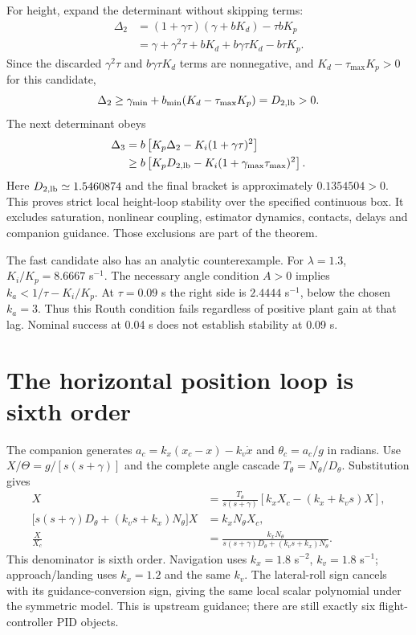 For height, expand the determinant without skipping terms:
\begin{align}
\Delta_2&=(1+\gamma\tau)(\gamma+bK_d)-\tau bK_p\\
&=\gamma+\gamma^2\tau+bK_d+b\gamma\tau K_d-b\tau K_p.
\end{align}
Since the discarded $\gamma^2\tau$ and $b\gamma\tau K_d$ terms are nonnegative,
and $K_d-\tau_{\max}K_p>0$ for this candidate,
\begin{equation}
\Delta_2\geq\gamma_{\min}+b_{\min}(K_d-\tau_{\max}K_p)
 =D_{2,\rm lb}>0.
\end{equation}
The next determinant obeys
\begin{align}
\Delta_3&=b\left[K_p\Delta_2-K_i(1+\gamma\tau)^2\right]\\
&\geq b\left[K_pD_{2,\rm lb}-K_i(1+\gamma_{\max}\tau_{\max})^2\right].
\end{align}
Here $D_{2,\rm lb}\simeq1.5460874$ and the final bracket is approximately
$0.1354504>0$. This proves strict local height-loop stability over the specified
continuous box. It excludes saturation, nonlinear coupling, estimator dynamics,
contacts, delays and companion guidance. Those exclusions are part of the theorem.

The fast candidate also has an analytic counterexample. For $\lambda=1.3$,
$K_i/K_p=8.6667$ s$^{-1}$. The necessary angle condition $A>0$ implies
$k_a<1/\tau-K_i/K_p$. At $\tau=0.09$ s the right side is
$2.4444$ s$^{-1}$, below the chosen $k_a=3$. Thus this Routh condition fails
regardless of positive plant gain at that lag. Nominal success at 0.04 s
does not establish stability at 0.09 s.

\section{The horizontal position loop is sixth order}
The companion generates $a_c=k_x(x_c-x)-k_v\dot x$ and $\theta_c=a_c/g$
in radians. Use $X/\Theta=g/[s(s+\gamma)]$ and the complete angle cascade
$T_\theta=N_\theta/D_\theta$. Substitution gives
\begin{align}
X&=\frac{T_\theta}{s(s+\gamma)}[k_xX_c-(k_x+k_vs)X],\\
\big[s(s+\gamma)D_\theta+(k_vs+k_x)N_\theta\big]X&=k_xN_\theta X_c,\\
\boxed{\frac{X}{X_c}}&=\boxed{\frac{k_xN_\theta}
 {s(s+\gamma)D_\theta+(k_vs+k_x)N_\theta}}.
\end{align}
This denominator is sixth order. Navigation uses $k_x=1.8$ s$^{-2}$,
$k_v=1.8$ s$^{-1}$; approach/landing uses $k_x=1.2$ and the same $k_v$.
The lateral-roll sign cancels with its guidance-conversion sign, giving the
same local scalar polynomial under the symmetric model. This is upstream
guidance; there are still exactly six flight-controller PID objects.

